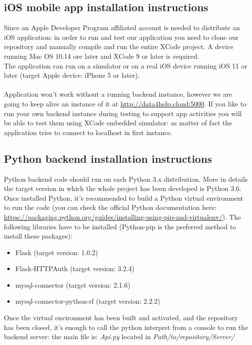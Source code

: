 \documentclass{article}
\begin{document}
\subsection{iOS mobile app installation instructions}
Since an Apple Developer Program affiliated account is needed to distribute an iOS application: in order to run and test our application you need to clone our repository and manually compile and run the entire XCode project. A device running Mac OS 10.14 ore later and XCode 9 or later is required. \\
	The application can run on a simulator or on a real iOS device running iOS 11 or later (target Apple device: iPhone 5 or later).	\\\\
	Application won't work without a running backend instance, however we are going to keep alive an instance of it at \url{http://data4help.cloud:5000}.
	If you like to run your own backend instance during testing to support app activities you will be able to test them using XCode embedded simulator: as matter of fact the application tries to connect to localhost in first instance.
\subsection{Python backend installation instructions}
Python backend code should run on each Python 3.x distribution. More in details the target version in which the whole project has been developed is Python 3.6.\\
Once installed Python, it's recommended to build a Python virtual environment to run the code (you can check the official Python documentation here: \url{https://packaging.python.org/guides/installing-using-pip-and-virtualenv/}). The following libraries have to be installed (Python-pip is the preferred method to install these packages):
\begin{itemize}
	\item Flask (target version: 1.0.2)
	\item Flask-HTTPAuth (target version: 3.2.4)
	\item mysql-connector (target version: 2.1.6)
	\item mysql-connector-python-rf (target version: 2.2.2)
\end{itemize}
Once the virtual environment has been built and activated, and the repository has been closed, it's enough to call the python interpret from a console to run the backend server: the main file is: \textit{Api.py} located in \textit{Path/to/repository/Server/} 
\end{document}
